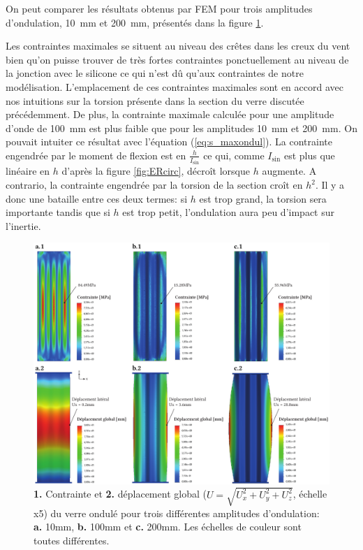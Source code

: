 \documentclass[11pt,titlepage]{article}
\begin{document}
On peut comparer les résultats obtenus par \acrshort{FEM} pour trois amplitudes d'ondulation, \qty{10}{\milli\meter} et \qty{200}{\milli\meter}, présentés dans la figure \ref{fig:ondulfemscreen}. 

Les contraintes maximales se situent au niveau des crêtes dans les creux du vent bien qu'on puisse trouver de très fortes contraintes ponctuellement au niveau de la jonction avec le silicone ce qui n'est dû qu'aux contraintes de notre modélisation. L'emplacement de ces contraintes maximales sont en accord avec nos intuitions sur la torsion présente dans la section du verre discutée précédemment. De plus, la contrainte maximale calculée pour une amplitude d'onde de \qty{100}{\milli\meter} est plus faible que pour les amplitudes \qty{10}{\milli\meter} et \qty{200}{\milli\meter}. On pouvait intuiter ce résultat avec l'équation (\ref{eq:s_maxondul}). La contrainte engendrée par le moment de flexion est en $\frac{h}{I_{\text{sin}}}$ ce qui, comme $I_{\text{sin}}$ est plus que linéaire en $h$ d'après la figure \ref{fig:ERcirc}, décroît lorsque $h$ augmente. A contrario, la contrainte engendrée par la torsion de la section croît en $h^2$. Il y a donc une bataille entre ces deux termes: si $h$ est trop grand, la torsion sera importante tandis que si $h$ est trop petit, l'ondulation aura peu d'impact sur l'inertie.

\begin{figure}[H]
    \centering
    \includegraphics[width=\linewidth]{img/ondul/fem/FEM1.pdf}
    \caption{\textbf{1.} Contrainte et \textbf{2.} déplacement global ($U = \sqrt{U_x^2 + U_y^2 + U_z^2}$, échelle x5) du verre ondulé pour trois différentes amplitudes d'ondulation: \textbf{a.} 10mm, \textbf{b.} 100mm et \textbf{c.} 200mm. Les échelles de couleur sont toutes différentes.}
    \label{fig:ondulfemscreen}
\end{figure}
\end{document}
